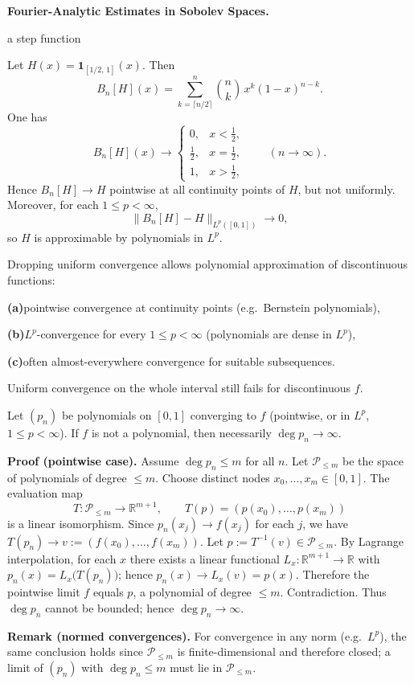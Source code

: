 \begin{problem}[CP-II-0420]
\label{prob:cp-ii-0420}
\textbf{Fourier-Analytic Estimates in Sobolev Spaces.}

\hspace*{1.5em}a step function

Let $H(x)=\mathbf{1}_{[1/2,\,1]}(x)$. Then
\[
B_n[H](x)=\sum_{k=\lceil n/2\rceil}^{n}\binom{n}{k}\,x^k(1-x)^{n-k}.
\]
One has
\[
B_n[H](x)\to
\begin{cases}
	0, & x<\tfrac{1}{2},\\[2pt]
	\tfrac12, & x=\tfrac{1}{2},\\[2pt]
	1, & x>\tfrac{1}{2},
\end{cases}
\qquad (n\to\infty).
\]
Hence $B_n[H]\to H$ pointwise at all continuity points of $H$, but not uniformly.
Moreover, for each $1\le p<\infty$,
\[
\|B_n[H]-H\|_{L^p([0,1])}\longrightarrow 0,
\]
so $H$ is approximable by polynomials in $L^p$.

\bigskip

Dropping uniform convergence allows polynomial approximation of discontinuous functions:
 \setlength{\itemsep}{0.6em}
	\par\smallskip\noindent\textbf{(a)}\quad pointwise convergence at continuity points (e.g.\ Bernstein polynomials),
	\par\smallskip\noindent\textbf{(b)}\quad $L^p$-convergence for every $1\le p<\infty$ (polynomials are dense in $L^p$),
	\par\smallskip\noindent\textbf{(c)}\quad often almost-everywhere convergence for suitable subsequences.

Uniform convergence on the whole interval still fails for discontinuous $f$.

Let $(p_n)$ be polynomials on $[0,1]$ converging to $f$ (pointwise, or in $L^p$, $1\le p<\infty$).
If $f$ is not a polynomial, then necessarily $\deg p_n\to\infty$.

\smallskip

\noindent\textbf{Proof (pointwise case).}
Assume $\deg p_n\le m$ for all $n$. Let $\mathcal P_{\le m}$ be the space of polynomials of degree $\le m$.
Choose distinct nodes $x_0,\dots,x_m\in[0,1]$. The evaluation map
\[
T:\mathcal P_{\le m}\to\mathbb{R}^{m+1}, \qquad T(p)=(p(x_0),\dots,p(x_m))
\]
is a linear isomorphism. Since $p_n(x_j)\to f(x_j)$ for each $j$, we have $T(p_n)\to v:=(f(x_0),\dots,f(x_m))$.
Let $p:=T^{-1}(v)\in\mathcal P_{\le m}$. By Lagrange interpolation, for each $x$ there exists a linear functional
$L_x:\mathbb{R}^{m+1}\to\mathbb{R}$ with $p_n(x)=L_x\!\big(T(p_n)\big)$; hence
$p_n(x)\to L_x(v)=p(x)$. Therefore the pointwise limit $f$ equals $p$, a polynomial of degree $\le m$.
Contradiction. Thus $\deg p_n$ cannot be bounded; hence $\deg p_n\to\infty$.


\smallskip

\noindent\textbf{Remark (normed convergences).}
For convergence in any norm (e.g.\ $L^p$), the same conclusion holds since
$\mathcal P_{\le m}$ is finite-dimensional and therefore closed; a limit of $(p_n)$ with $\deg p_n\le m$
must lie in $\mathcal P_{\le m}$.
\end{problem}

